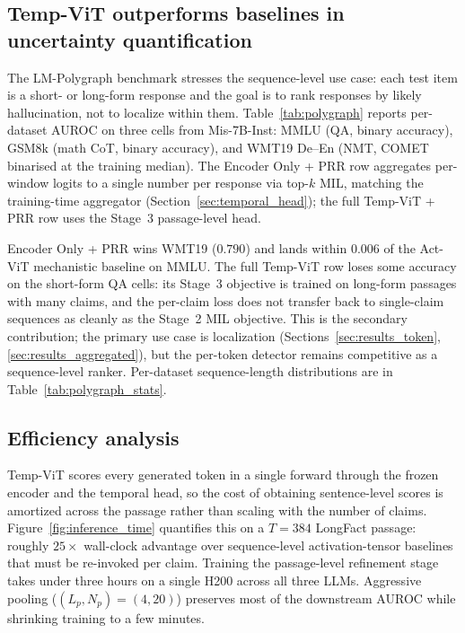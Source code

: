 \subsection{Temp-ViT outperforms baselines in uncertainty
quantification}
\label{sec:results_polygraph}



The LM-Polygraph benchmark
\citep{fadeeva2023lmpolygraph,vashurin2025lmpolygraph} stresses
the sequence-level use case: each test item is a short- or long-form
response and the goal is to rank responses by likely hallucination,
not to localize within them. Table~\ref{tab:polygraph} reports
per-dataset AUROC on three cells from Mis-7B-Inst:
MMLU (QA, binary accuracy), GSM8k (math CoT, binary accuracy),
and WMT19 De--En (NMT, COMET binarised at the training median).
The Encoder Only + PRR row aggregates per-window logits to a
single number per response via top-$k$ MIL, matching the
training-time aggregator (Section~\ref{sec:temporal_head}); the
full Temp-ViT + PRR row uses the Stage~3 passage-level head.

Encoder Only + PRR wins WMT19 ($0.790$) and lands within $0.006$
of the Act-ViT mechanistic baseline on MMLU. The full Temp-ViT
row loses some accuracy on the short-form QA cells: its Stage~3
objective is trained on long-form passages with many claims, and
the per-claim loss does not transfer back to single-claim
sequences as cleanly as the Stage~2 MIL objective. This is the
secondary contribution; the primary use case is localization
(Sections~\ref{sec:results_token}, \ref{sec:results_aggregated}),
but the per-token detector remains competitive as a sequence-level
ranker. Per-dataset sequence-length distributions are in
Table~\ref{tab:polygraph_stats}.

\subsection{Efficiency analysis}
\label{sec:results_efficiency}

Temp-ViT scores every generated token in a single forward through
the frozen encoder and the temporal head, so the cost of obtaining
sentence-level scores is amortized across the passage
rather than scaling with the number of claims.
Figure~\ref{fig:inference_time} quantifies this on a $T = 384$
LongFact passage: roughly $25\times$ wall-clock advantage over
sequence-level activation-tensor baselines that must be re-invoked
per claim. Training the passage-level
refinement stage takes under three hours on a single H200 across
all three LLMs. Aggressive pooling
($(L_p, N_p) = (4, 20)$) preserves most of the downstream AUROC
while shrinking training to a few minutes.


